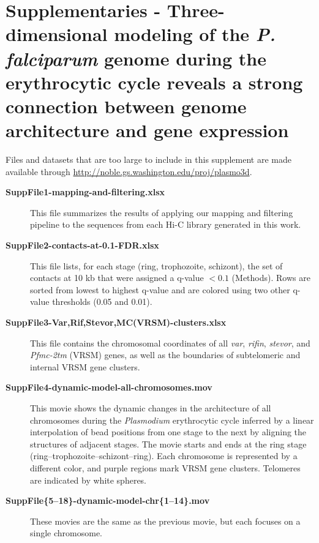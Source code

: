 
\chapter[Supplementary material for
Genome architecture of the \emph{P. falciparum}
genome]{Supplementaries - Three-dimensional modeling of the {\em P. falciparum} genome during
the erythrocytic cycle reveals a strong connection between genome
architecture and gene expression} %

\graphicspath{{8_plasmodium_supplementaries/}}

\begin{center}
\begin{flushleft}

Files and datasets that are too large to include in this supplement are made available through \url{http://noble.gs.washington.edu/proj/plasmo3d}.

\begin{description}
    \item[\textbf{SuppFile1-mapping-and-filtering.xlsx}] This file summarizes the
        results of applying our mapping and filtering pipeline to the sequences from
        each Hi-C library generated in this work.

    \item[\textbf{SuppFile2-contacts-at-0.1-FDR.xlsx}] This file lists, for each stage
        (ring, trophozoite, schizont), the set of contacts at 10 kb that were assigned
        a q-value $< 0.1$ (Methods). Rows are sorted from lowest to highest q-value and
        are colored using two other q-value thresholds (0.05 and 0.01).

    \item[\textbf{SuppFile3-Var,Rif,Stevor,MC(VRSM)-clusters.xlsx}] This file contains
        the chromosomal coordinates of all \emph{var}, \emph{rifin}, \emph{stevor}, and
        \emph{Pfmc-2tm} (VRSM) genes, as well as the boundaries of subtelomeric and internal
        VRSM gene clusters.

    \item[\textbf{SuppFile4-dynamic-model-all-chromosomes.mov}] This movie
        shows the dynamic changes in the architecture of all chromosomes during
        the \emph{Plasmodium} erythrocytic cycle inferred by a linear interpolation
        of bead positions from one stage to the next by aligning the structures
        of adjacent stages. The movie starts and ends at the ring stage
        (ring--trophozoite--schizont--ring). Each chromosome is represented
        by a different color, and purple regions mark VRSM gene clusters.
        Telomeres are indicated by white spheres.

    \item[\textbf{SuppFile\{5--18\}-dynamic-model-chr\{1--14\}.mov}]
        These movies are the same as the previous movie, but each focuses on a single chromosome.
\end{description}
\end{flushleft}
\end{center}

